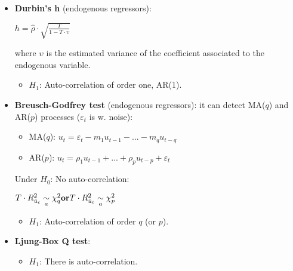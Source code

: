 \documentclass[10pt, a4paper, landscape]{extarticle}
\begin{document}
\begin{multicols}{3}
\begin{itemize}[leftmargin=*]
\begin{itemize}[leftmargin=*]
\begin{center}
				\end{center}
				\item \textbf{Durbin's h} (endogenous regressors):
				\begin{center}
					$h = \hat{\rho} \cdot \sqrt{\frac{T}{1 - T \cdot \upsilon}}$
				\end{center}
				where $\upsilon$ is the estimated variance of the coefficient associated to the endogenous variable.
				\begin{itemize}[leftmargin=*]
					\item $H_1$: Auto-correlation of order one, AR(1).
				\end{itemize}
				\item \textbf{Breusch-Godfrey test} (endogenous regressors): it can detect MA($q$) and AR($p$) processes ($\varepsilon_t$ is w. noise):
				\begin{itemize}[leftmargin=*]
					\item MA($q$): $u_t = \varepsilon_t - m_1 u_{t-1} - ... - m_q u_{t-q}$
					\item AR($p$): $u_t = \rho_1 u_{t-1} + ... + \rho_p u_{t-p} + \varepsilon_t$
				\end{itemize}
				Under $H_0$: No auto-correlation:
				\begin{center}
					$\hfill T \cdot R^2_{\hat{u}_t} \underset{a}{\sim} \chi^2_q \hfill \textbf{or} \hfill T \cdot R^2_{\hat{u}_t} \underset{a}{\sim} \chi^2_p \hfill$
				\end{center}
				\begin{itemize}[leftmargin=*]
					\item $H_1$: Auto-correlation of order $q$ (or $p$).
				\end{itemize}
				\item \textbf{Ljung-Box Q test}:
				\begin{itemize}[leftmargin=*]
					\item $H_1$: There is auto-correlation.
				\end{itemize}
			\end{itemize}
		\end{itemize}

\end{multicols}
\end{document}
